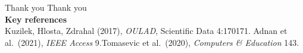 \documentclass[aspectratio=169,10pt]{beamer}
\begin{document}
\begin{frame}[plain]{Thank you}
  \vfill\centering
  {\Huge\textcolor{ccnured}{Thank you}}\\[1.0em]
  {\footnotesize\textbf{Key references}}\\[0.3em]
  {\scriptsize
   Kuzilek, Hlosta, Zdrahal (2017), \emph{OULAD}, Scientific Data 4:170171.\quad
   Adnan et al.\ (2021), \emph{IEEE Access} 9.\quad Tomasevic et al.\ (2020), \emph{Computers \& Education} 143.}
  \vfill
\end{frame}
\end{document}

